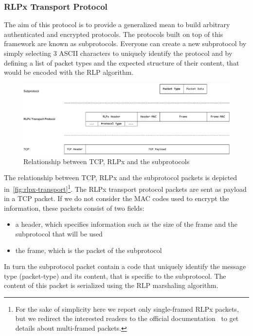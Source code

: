 \subsubsection{RLPx Transport Protocol}
\label{sec:rlpx-transport-protocol}

The aim of this protocol is to provide a generalized mean to build arbitrary
authenticated and encrypted protocols. The protocols built on top of this 
framework are known as subprotocols. Everyone can create a new subprotocol by 
simply selecting $3$ ASCII characters to uniquely identify the protocol and by
defining a list of packet types and the expected structure of their content, 
that would be encoded with the RLP algorithm.

\begin{figure}
    \begin{center}
        \includegraphics[width=\textwidth]{./res/img/rlpx-transport}
        \caption{Relationship between TCP, RLPx and the subprotocols}
        \label{fig:rlpx-transport}
    \end{center}
\end{figure}

The relationship between TCP, RLPx and the subprotocol packets is depicted 
in~\autoref{fig:rlpx-transport}\footnote{For the sake of simplicity here we 
report only single-framed RLPx packets, but we redirect the interested readers 
to the official documentation~\cite{rlpx} to get details about multi-framed 
packets.}. The RLPx transport protocol packets are sent as payload in a TCP 
packet. If we do not consider the MAC codes used to encrypt the information, 
these packets consist of two fields:
\begin{itemize}
    \item a header, which specifies information such as the size of the frame 
    and the subprotocol that will be used
    \item the frame, which is the packet of the subprotocol
\end{itemize}

In turn the subprotocol packet contain a code that uniquely identify the message
type (packet-type) and its content, that is specific to the subprotocol. The 
content of this packet is serialized using the RLP marshaling algorithm.

